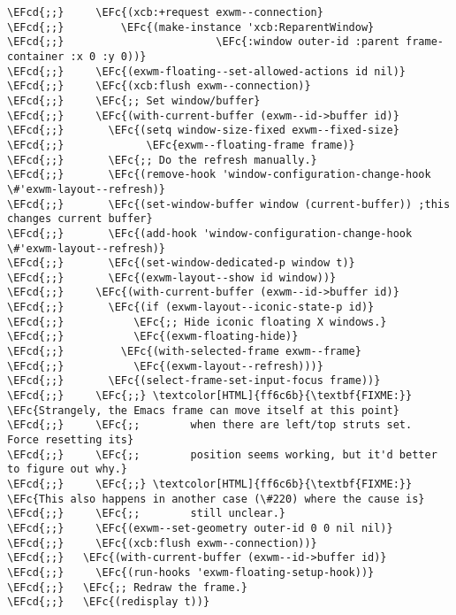 \documentclass[a4wide,10pt]{article}
\newcommand{\EFc}[1]{\textcolor{EFc}{#1}} %
\newcommand{\EFcd}[1]{\textcolor{EFcd}{#1}} %
\begin{document}
\begin{Code}
\begin{Verbatim}
\EFcd{;;}     \EFc{(xcb:+request exwm--connection}
\EFcd{;;}         \EFc{(make-instance 'xcb:ReparentWindow}
\EFcd{;;}                        \EFc{:window outer-id :parent frame-container :x 0 :y 0))}
\EFcd{;;}     \EFc{(exwm-floating--set-allowed-actions id nil)}
\EFcd{;;}     \EFc{(xcb:flush exwm--connection)}
\EFcd{;;}     \EFc{;; Set window/buffer}
\EFcd{;;}     \EFc{(with-current-buffer (exwm--id->buffer id)}
\EFcd{;;}       \EFc{(setq window-size-fixed exwm--fixed-size}
\EFcd{;;}             \EFc{exwm--floating-frame frame)}
\EFcd{;;}       \EFc{;; Do the refresh manually.}
\EFcd{;;}       \EFc{(remove-hook 'window-configuration-change-hook \#'exwm-layout--refresh)}
\EFcd{;;}       \EFc{(set-window-buffer window (current-buffer)) ;this changes current buffer}
\EFcd{;;}       \EFc{(add-hook 'window-configuration-change-hook \#'exwm-layout--refresh)}
\EFcd{;;}       \EFc{(set-window-dedicated-p window t)}
\EFcd{;;}       \EFc{(exwm-layout--show id window))}
\EFcd{;;}     \EFc{(with-current-buffer (exwm--id->buffer id)}
\EFcd{;;}       \EFc{(if (exwm-layout--iconic-state-p id)}
\EFcd{;;}           \EFc{;; Hide iconic floating X windows.}
\EFcd{;;}           \EFc{(exwm-floating-hide)}
\EFcd{;;}         \EFc{(with-selected-frame exwm--frame}
\EFcd{;;}           \EFc{(exwm-layout--refresh)))}
\EFcd{;;}       \EFc{(select-frame-set-input-focus frame))}
\EFcd{;;}     \EFc{;;} \textcolor[HTML]{ff6c6b}{\textbf{FIXME:}} \EFc{Strangely, the Emacs frame can move itself at this point}
\EFcd{;;}     \EFc{;;        when there are left/top struts set.  Force resetting its}
\EFcd{;;}     \EFc{;;        position seems working, but it'd better to figure out why.}
\EFcd{;;}     \EFc{;;} \textcolor[HTML]{ff6c6b}{\textbf{FIXME:}} \EFc{This also happens in another case (\#220) where the cause is}
\EFcd{;;}     \EFc{;;        still unclear.}
\EFcd{;;}     \EFc{(exwm--set-geometry outer-id 0 0 nil nil)}
\EFcd{;;}     \EFc{(xcb:flush exwm--connection))}
\EFcd{;;}   \EFc{(with-current-buffer (exwm--id->buffer id)}
\EFcd{;;}     \EFc{(run-hooks 'exwm-floating-setup-hook))}
\EFcd{;;}   \EFc{;; Redraw the frame.}
\EFcd{;;}   \EFc{(redisplay t))}


\end{Verbatim}
\end{Code}
\end{document}
